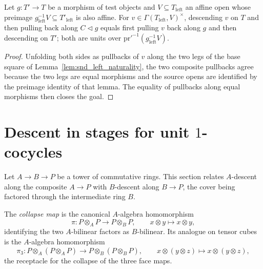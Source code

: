 \begin{theorem}
  \label{thm:unitsSndEquiv_naturality}
  \leanok
  Let \(g \colon T' \to T\) be a morphism of test objects and \(V \subseteq T_{\mathrm{left}}\)
  an affine open whose preimage \(g_{\mathrm{left}}^{-1} V \subseteq T'_{\mathrm{left}}\) is also
  affine.  For \(v \in \Gamma(T_{\mathrm{left}}, V)^{\times}\), descending \(v\) on \(T\) and
  then pulling back along \(C \lhd g\) equals first pulling \(v\) back along \(g\) and then
  descending on \(T'\); both are units over \(\mathrm{pr}'^{-1}(g_{\mathrm{left}}^{-1} V)\).
\end{theorem}
\begin{proof}
  \leanok
  Unfolding both sides as pullbacks of \(v\) along the two legs of the base square of
  Lemma~\ref{lem:snd_left_naturality}, the two composite pullbacks agree because the two legs are
  equal morphisms and the source opens are identified by the preimage identity of that lemma.
  The equality of pullbacks along equal morphisms then closes the goal.
\end{proof}

\section{Descent in stages for unit \(1\)-cocycles}
\label{sec:unitDescentComposite}

Let \(A \to B \to P\) be a tower of commutative rings.  This section relates \(A\)-descent
along the composite \(A \to P\) with \(B\)-descent along \(B \to P\), the cover being factored
through the intermediate ring \(B\).

\begin{definition}
  \label{def:module_tensorCollapse}
  \leanok
  The \emph{collapse map} is the canonical \(A\)-algebra homomorphism
  \[
    \pi \colon P \otimes_A P \longrightarrow P \otimes_B P, \qquad x \otimes y \mapsto x \otimes
    y,
  \]
  identifying the two \(A\)-bilinear factors as \(B\)-bilinear.  Its analogue on tensor cubes is
  the \(A\)-algebra homomorphism
  \[
    \pi_3 \colon P \otimes_A (P \otimes_A P) \longrightarrow P \otimes_B (P \otimes_B P), \qquad
    x \otimes (y \otimes z) \mapsto x \otimes (y \otimes z),
  \]
  the receptacle for the collapse of the three face maps.
\end{definition}


